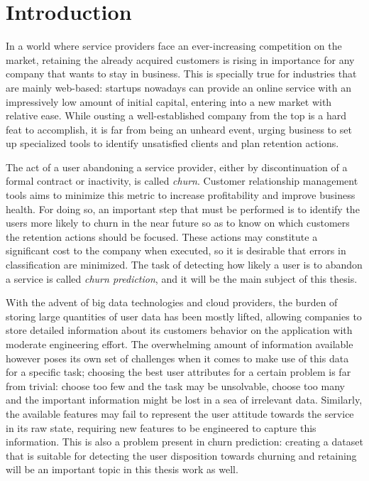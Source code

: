 \documentclass{kththesis}
\begin{document}
\clearpage

\cleardoublepage

\tableofcontents

\listoffigures
 
\listoftables


\mainmatter


\chapter{Introduction}

		In a world where service providers face an ever-increasing competition on the market, retaining the already acquired customers is rising in importance for any company that wants to stay in business. This is specially true for industries that are mainly web-based: startups nowadays can provide an online service with  an impressively low amount of initial capital, entering into a new market with relative ease. While ousting a well-established company from the top is a hard feat to accomplish, it is far from being an unheard event, urging business to set up specialized tools to identify unsatisfied clients and plan retention actions. 
		
	The act of a user abandoning a service provider, either by discontinuation of a formal contract or inactivity, is called \emph{churn}. Customer relationship management tools  aims to minimize this metric to increase profitability and improve business health. For doing so, an important step that must be performed is to identify the users more likely to churn in the near future so as to know on which customers the retention actions should be focused. These actions may constitute a significant cost to the company when executed, so it is desirable that errors in classification are minimized. The task of detecting how likely a user is to abandon a service is called \emph{churn prediction}, and it will be the main subject of this thesis.
	
	With the advent of big data technologies and cloud providers, the burden of storing large quantities of user data has been mostly lifted, allowing companies to store detailed information about its customers behavior on the application with moderate engineering effort. The overwhelming amount of information available however poses its own set of challenges when it comes to make use of this data for a specific task; choosing the best user attributes for a certain problem is far from trivial: choose too few and the task may be unsolvable, choose too many and the important information might be lost in a sea of irrelevant data. Similarly, the available features may fail to represent the user attitude towards the service in its raw state, requiring  new features to be engineered to capture this information. This is also a problem present in churn prediction: creating a dataset that is suitable for detecting the user disposition towards churning and retaining will be an important topic in this thesis work as well.
	
\end{document}
